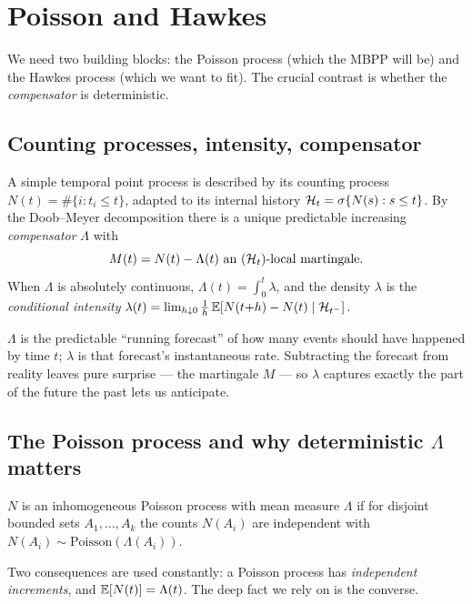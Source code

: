 \section{Poisson and Hawkes}
\label{sec:poisson-hawkes}

We need two building blocks: the Poisson process (which the MBPP will be) and the
Hawkes process (which we want to fit). The crucial contrast is whether the
\emph{compensator} is deterministic.

\subsection{Counting processes, intensity, compensator}

A simple temporal point process is described by its counting process
$N(t)=\#\{i:t_i\le t\}$, adapted to its internal history
$\mathcal{H}_t=\sigma\{N(s):s\le t\}$. By the Doob--Meyer decomposition there is a unique
predictable increasing \emph{compensator} $\Lambda$ with
\begin{equation}
M(t)=N(t)-\Lambda(t)\ \text{an }(\mathcal{H}_t)\text{-local martingale.}
\end{equation}
When $\Lambda$ is absolutely continuous, $\Lambda(t)=\int_0^t\lambda$, and the
density $\lambda$ is the \emph{conditional intensity}
$\lambda(t)=\lim_{h\downarrow0}\frac1h\,\mathbb{E}[N(t{+}h)-N(t)\mid\mathcal{H}_{t^-}]$.

\begin{intuition}
$\Lambda$ is the predictable ``running forecast'' of how many events should have
happened by time $t$; $\lambda$ is that forecast's instantaneous rate. Subtracting
the forecast from reality leaves pure surprise --- the martingale $M$ --- so
$\lambda$ captures exactly the part of the future the past lets us anticipate.
\end{intuition}

\subsection{The Poisson process and why deterministic $\Lambda$ matters}

\begin{definition}
$N$ is an inhomogeneous Poisson process with mean measure $\Lambda$ if for disjoint
bounded sets $A_1,\dots,A_k$ the counts $N(A_i)$ are independent with
$N(A_i)\sim\mathrm{Poisson}(\Lambda(A_i))$.
\end{definition}

Two consequences are used constantly: a Poisson process has \emph{independent
increments}, and $\mathbb{E}[N(t)]=\Lambda(t)$. The deep fact we rely on is the converse.

